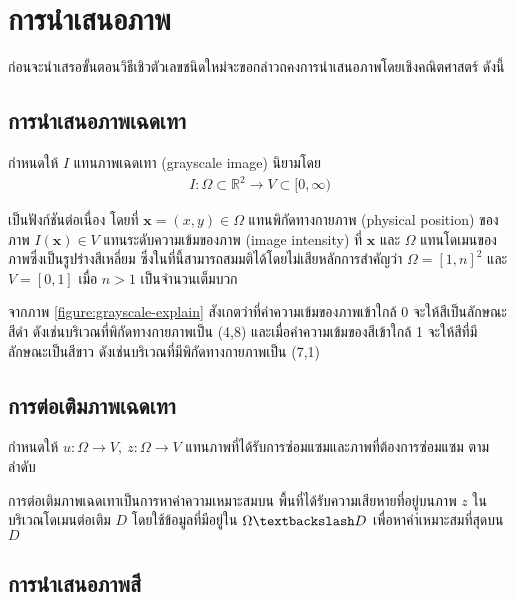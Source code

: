\section{การนำเสนอภาพ}

\hspace{1cm} ก่อนจะนำเสรอขั้นตอนวิธีเชิวตัวเลขชนิดใหม่จะขอกล่าวถคงการนำเสนอภาพโดยเชิงคณิตศาสตร์ ดังนี้

\subsection{การนำเสนอภาพเฉดเทา}

\hspace{1cm} กำหนดให้ $I$ แทนภาพเฉดเทา (grayscale image) นิยามโดย
\begin{align*}
    I : \Omega \subset \mathbb{R}^2 \rightarrow V \subset [0,\infty)	
\end{align*}

 เป็นฟังก์ชันต่อเนื่อง โดยที่ $ \mathbf{x} = (x,y) \in \Omega $ แทนพิกัดทางกายภาพ (physical position) ของภาพ $ I(\mathbf{x}) \in V $ แทนระดับความเข้มของภาพ (image intensity) ที่ $ \mathbf{x} $ และ $ \Omega $ แทนโดเมนของภาพซึ่งเป็นรูปร่างสีเหลี่ยม ซึ่งในที่นี้สามารถสมมติได้โดยไม่เสียหลักการสำคัญว่า $ \Omega = [1,n]^2 $ และ $ V = [0,1] $ เมื่อ $n>1$ เป็นจำนวนเต็มบวก 



\hspace{1cm} จากภาพ \ref{figure:grayscale-explain} สังเกตว่าที่ค่าความเข้มของภาพเข้าใกล้ 0 จะให้สีเป็นลักษณะสีดำ ดังเช่นบริเวณที่พิกัดทางกายภาพเป็น (4,8) และเมื่อค่าความเข้มของสีเข้าใกล้ 1 จะให้สีที่มีลักษณะเป็นสีขาว ดังเช่นบริเวณที่มีพิกัดทางกายภาพเป็น (7,1)

\subsection{การต่อเติมภาพเฉดเทา}

\hspace{1cm} กำหนดให้ $ u: \Omega \rightarrow V,\ z: \Omega \rightarrow V$ แทนภาพที่ได้รับการซ่อมแซมและภาพที่ต้องการซ่อมแซม ตามลำดับ



\hspace{1cm} การต่อเติมภาพเฉดเทาเป็นการหาค่าความเหมาะสมบน พื้นที่ได้รับความเสียหายที่อยู่บนภาพ $z$ ในบริเวณโดเมนต่อเติม $D$ โดยใช้ข้อมูลที่มีอยู่ใน $\Omega \textbackslash D$ เพื่อหาค่า่เหมาะสมที่สุดบน $D$ 

\subsection{การนำเสนอภาพสี}

